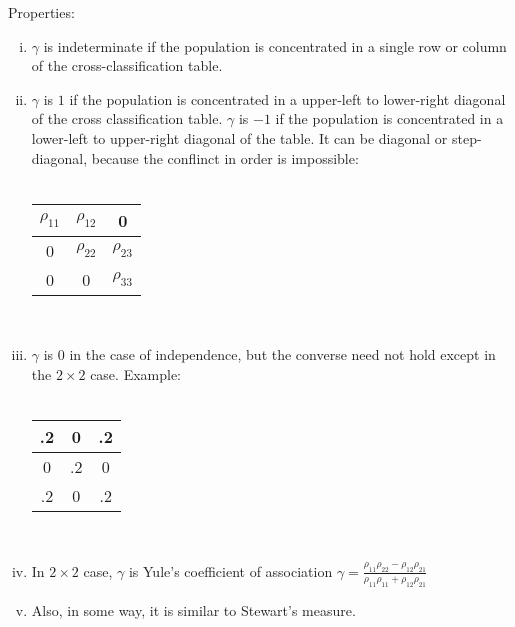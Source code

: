 \documentclass[]{article}
\begin{document}
Properties:
\begin{enumerate}[(i)]
	\item $\gamma$ is indeterminate if the population is concentrated in a single row or column of the cross-classification table.
	\item $\gamma$ is $1$ if the population is concentrated in a upper-left to lower-right diagonal of the cross classification table. $\gamma$ is $-1$ if the population is concentrated in a lower-left to upper-right diagonal of the table. It can be diagonal or step-diagonal, because the conflinct in order is impossible:\\
	~\\
	\begin{tabular}{ c | c | c }
	  $\rho_{11}$ & $\rho_{12}$ & 0\\
		\hline
	  0 & $\rho_{22}$ & $\rho_{23}$\\
		\hline
	  0 & 0 & $\rho_{33}$\\
	\end{tabular}
	~\\
	\item $\gamma$ is $0$ in the case of independence, but the converse need not hold except in the $2\times 2$ case. Example:\\
	~\\
	\begin{tabular}{ c | c | c }
	  .2 & 0 & .2\\
		\hline
	  0 & .2 & 0\\
		\hline
	  .2 & 0 & .2\\
	\end{tabular}
	~\\
	\item In $2\times 2$ case, $\gamma$ is Yule's coefficient of association $\gamma=\frac{\rho_{11}\rho_{22} - \rho_{12}\rho_{21}}{\rho_{11}\rho_{11}+\rho_{12}\rho_{21}}$
  \item Also, in some way, it is similar to Stewart's measure.
\end{enumerate}
\end{document}
